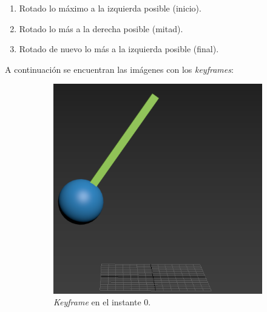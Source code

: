 \documentclass{article}
\begin{document}
\begin{enumerate}
    \item Rotado lo máximo a la izquierda posible (inicio).
    \item Rotado lo más a la derecha posible (mitad).
    \item Rotado de nuevo lo más a la izquierda posible (final).
\end{enumerate}

\bigskip

A continuación se encuentran las imágenes con los \textit{keyframes}:

\begin{figure}[H]
    \centering
	\begin{subfigure}[H]{0.3\textwidth}
	    \centering
	    \includegraphics[width=\textwidth]{imagenes/Ejercicio 3/pen_0.png}
        \caption{\textit{Keyframe} en el instante 0.}
	\end{subfigure}
    \hfill
	\begin{subfigure}[H]{0.3\textwidth}
	    \centering

\end{subfigure}
\end{figure}
\end{document}
